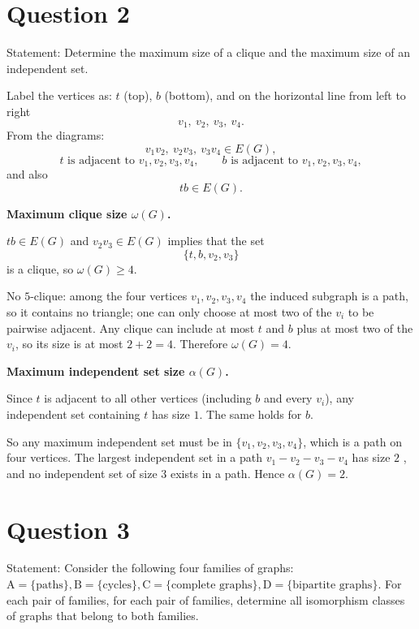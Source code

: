\documentclass[11pt]{article}
\begin{document}
\newpage

\section*{Question 2}

Statement: Determine the maximum size of a clique and the maximum size of an independent set.

\medskip

\noindent Label the vertices as: $t$ (top), $b$ (bottom), and on the horizontal line from left to right
\[
v_1,\ v_2,\ v_3,\ v_4.
\]
From the diagrams:
\[
v_1v_2,\ v_2v_3,\ v_3v_4 \in E(G),
\]
\[
t \text{ is adjacent to } v_1,v_2,v_3,v_4,\qquad
b \text{ is adjacent to } v_1,v_2,v_3,v_4,
\]
and also
\[
tb \in E(G).
\]

\medskip
\noindent\textbf{Maximum clique size $\omega(G)$.}

$tb\in E(G)$ and $v_2v_3\in E(G)$ implies that the set
\[
\{t,b,v_2,v_3\}
\]
is a clique, so $\omega(G)\ge 4$.

No $5$-clique: among the four vertices $v_1,v_2,v_3,v_4$ the induced subgraph
is a path, so it contains no triangle; one can only choose at most two of the $v_i$
to be pairwise adjacent. Any clique can include at most $t$ and $b$ plus at most two of the $v_i$,
so its size is at most $2+2=4$. Therefore $\omega(G)=4$.

\medskip
\noindent\textbf{Maximum independent set size $\alpha(G)$.}

Since $t$ is adjacent to all other vertices (including $b$ and every $v_i$), any independent set
containing $t$ has size $1$. The same holds for $b$.

So any maximum independent set must be in $\{v_1,v_2,v_3,v_4\}$, which is a path on
four vertices. The largest independent set in a path $v_1-v_2-v_3-v_4$ has size $2$
, and no independent set of size $3$ exists in a path.
Hence $\alpha(G)=2$.

\newpage

\section*{Question 3}

Statement: Consider the following four families of graphs: $\text{A}=\{\text{paths}\},\text{B}=\{\text{cycles}\},\text{C}=\{\text{complete graphs}\},\text{D}=\{\text{bipartite graphs}\}$. For each pair of families, for each pair of families, determine all isomorphism classes of graphs that belong to both families.
\end{document}
